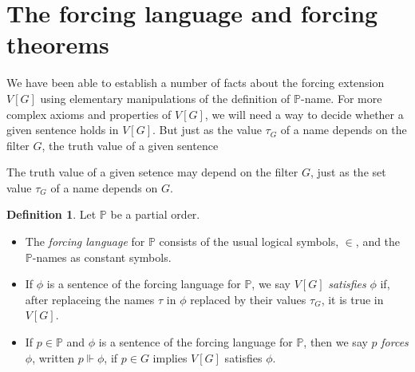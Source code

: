\documentclass[11pt,oneside]{amsbook}
\newcommand{\PP}{\mathbb P}
\theoremstyle{definition}
\theoremstyle{plain}
\theoremstyle{definition}
\newtheorem{defn}[thm]{Definition}
\theoremstyle{remark}
\begin{document}


\section{The forcing language and forcing theorems}

We have been able to establish a number of facts about the forcing extension $V[G]$ using elementary manipulations of the definition of $\mathbb P$-name. For more complex axioms and properties of $V[G]$, we will need a way to decide whether a given sentence holds in $V[G]$. But just as the value $\tau_G$ of a name depends on the filter $G$, the truth value of a given sentence

The truth value of a given setence may depend on the filter $G$, just as the set value $\tau_G$ of a name depends on $G$.

\begin{defn}
  Let $\PP$ be a partial order.
  \begin{itemize}
  \item The \emph{forcing language} for $\PP$ consists of the usual logical symbols, $\in$, and the $\PP$-names as constant symbols.
  \item If $\phi$ is a sentence of the forcing language for $\PP$, we say $V[G]$ \emph{satisfies} $\phi$ if, after replaceing the names $\tau$ in $\phi$ replaced by their values $\tau_G$, it is true in $V[G]$.
  \item If $p\in\PP$ and $\phi$ is a sentence of the forcing language for $\PP$, then we say $p$ \emph{forces} $\phi$, written $p\Vdash\phi$, if $p\in G$ implies $V[G]$ satisfies $\phi$.
  \end{itemize}
\end{defn}
\end{document}
